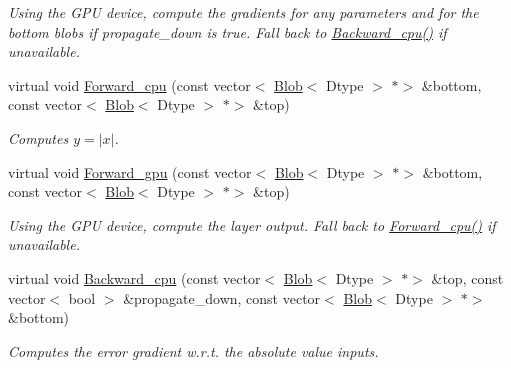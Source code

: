 \begin{DoxyCompactItemize}
\begin{DoxyCompactList}\small\item\em Using the G\+PU device, compute the gradients for any parameters and for the bottom blobs if propagate\+\_\+down is true. Fall back to \mbox{\hyperlink{classcaffe_1_1_abs_val_layer_abac024a0ee583ecc7d83311363bcfa72}{Backward\+\_\+cpu()}} if unavailable. \end{DoxyCompactList}\item 
virtual void \mbox{\hyperlink{classcaffe_1_1_abs_val_layer_a1d63991d879fef0806b63eb65f275a2b}{Forward\+\_\+cpu}} (const vector$<$ \mbox{\hyperlink{classcaffe_1_1_blob}{Blob}}$<$ Dtype $>$ $\ast$$>$ \&bottom, const vector$<$ \mbox{\hyperlink{classcaffe_1_1_blob}{Blob}}$<$ Dtype $>$ $\ast$$>$ \&top)
\begin{DoxyCompactList}\small\item\em Computes $ y = |x| $. \end{DoxyCompactList}\item 
\mbox{\label{classcaffe_1_1_abs_val_layer_a12283057a144e9ff648a583de36b7fbd}} 
virtual void \mbox{\hyperlink{classcaffe_1_1_abs_val_layer_a12283057a144e9ff648a583de36b7fbd}{Forward\+\_\+gpu}} (const vector$<$ \mbox{\hyperlink{classcaffe_1_1_blob}{Blob}}$<$ Dtype $>$ $\ast$$>$ \&bottom, const vector$<$ \mbox{\hyperlink{classcaffe_1_1_blob}{Blob}}$<$ Dtype $>$ $\ast$$>$ \&top)
\begin{DoxyCompactList}\small\item\em Using the G\+PU device, compute the layer output. Fall back to \mbox{\hyperlink{classcaffe_1_1_abs_val_layer_a094d7da8c6d6eeebc7db189f4cd258f9}{Forward\+\_\+cpu()}} if unavailable. \end{DoxyCompactList}\item 
virtual void \mbox{\hyperlink{classcaffe_1_1_abs_val_layer_a3def7ff434a338e0cb15baaa80fa23cd}{Backward\+\_\+cpu}} (const vector$<$ \mbox{\hyperlink{classcaffe_1_1_blob}{Blob}}$<$ Dtype $>$ $\ast$$>$ \&top, const vector$<$ bool $>$ \&propagate\+\_\+down, const vector$<$ \mbox{\hyperlink{classcaffe_1_1_blob}{Blob}}$<$ Dtype $>$ $\ast$$>$ \&bottom)
\begin{DoxyCompactList}\small\item\em Computes the error gradient w.\+r.\+t. the absolute value inputs. \end{DoxyCompactList}\item 
\mbox{\label{classcaffe_1_1_abs_val_layer_aff44062e9eb243c195285bee25b1eefb}} 

\end{DoxyCompactItemize}
